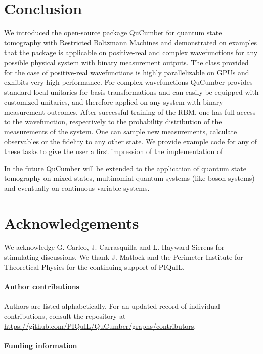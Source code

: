 \documentclass[submission, Phys, hidelinks]{SciPost}
\newcommand{\red}[1]{{\color{red} #1}}
\begin{document}
\section{Conclusion}
\red{
We introduced the open-source package QuCumber for quantum state tomography with Restricted Boltzmann Machines and demonstrated on examples that
the package is applicable on positive-real and complex wavefunctions for any possible physical system with binary measurement outputs.
The class provided for the case of positive-real wavefunctions is highly parallelizable on GPUs and exhibits very high performance.
For complex wavefunctions QuCumber provides standard local unitaries for basis transformations
and can easily be equipped with customized unitaries, and therefore applied on any system with binary measurement outcomes.
After successful training of the RBM, one has full access to the wavefunction, respectively to the probability distribution of the measurements of the system.
One can sample new measurements, calculate observables or the fidelity to any other state.
We provide example code for any of these tasks to give the user a first impression of the implementation of

In the future QuCumber will be extended to the application of quantum state tomography on mixed states, multinomial quantum systems (like boson systems) and eventually on continuous variable systems.
}

\section*{Acknowledgements}
We acknowledge G. Carleo, J. Carrasquilla and L. Hayward Sierens for stimulating discussions. 
We thank J. Matlock and the Perimeter Institute for Theoretical Physics for the continuing support of PIQuIL.

\paragraph{Author contributions}
Authors are listed alphabetically. For an updated record of individual contributions, consult the repository at \url{https://github.com/PIQuIL/QuCumber/graphs/contributors}.

\paragraph{Funding information}
\end{document}
